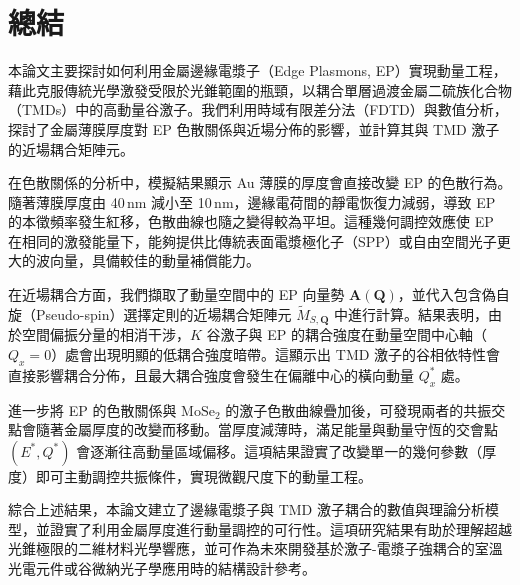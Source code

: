 \chapter{總結}

本論文主要探討如何利用金屬邊緣電漿子（Edge Plasmons, EP）實現動量工程，藉此克服傳統光學激發受限於光錐範圍的瓶頸，以耦合單層過渡金屬二硫族化合物（TMDs）中的高動量谷激子。我們利用時域有限差分法（FDTD）與數值分析，探討了金屬薄膜厚度對 EP 色散關係與近場分佈的影響，並計算其與 TMD 激子的近場耦合矩陣元。

在色散關係的分析中，模擬結果顯示 Au 薄膜的厚度會直接改變 EP 的色散行為。隨著薄膜厚度由 40\,nm 減小至 10\,nm，邊緣電荷間的靜電恢復力減弱，導致 EP 的本徵頻率發生紅移，色散曲線也隨之變得較為平坦。這種幾何調控效應使 EP 在相同的激發能量下，能夠提供比傳統表面電漿極化子（SPP）或自由空間光子更大的波向量，具備較佳的動量補償能力。

在近場耦合方面，我們擷取了動量空間中的 EP 向量勢 $\mathbf{A}(\mathbf{Q})$，並代入包含偽自旋（Pseudo-spin）選擇定則的近場耦合矩陣元 $\tilde{M}_{S,\mathbf{Q}}$ 中進行計算。結果表明，由於空間偏振分量的相消干涉，$K$ 谷激子與 EP 的耦合強度在動量空間中心軸（$Q_x = 0$）處會出現明顯的低耦合強度暗帶。這顯示出 TMD 激子的谷相依特性會直接影響耦合分佈，且最大耦合強度會發生在偏離中心的橫向動量 $Q_x^*$ 處。

進一步將 EP 的色散關係與 $\text{MoSe}_2$ 的激子色散曲線疊加後，可發現兩者的共振交點會隨著金屬厚度的改變而移動。當厚度減薄時，滿足能量與動量守恆的交會點 $(E^*, Q^*)$ 會逐漸往高動量區域偏移。這項結果證實了改變單一的幾何參數（厚度）即可主動調控共振條件，實現微觀尺度下的動量工程。

綜合上述結果，本論文建立了邊緣電漿子與 TMD 激子耦合的數值與理論分析模型，並證實了利用金屬厚度進行動量調控的可行性。這項研究結果有助於理解超越光錐極限的二維材料光學響應，並可作為未來開發基於激子-電漿子強耦合的室溫光電元件或谷微納光子學應用時的結構設計參考。